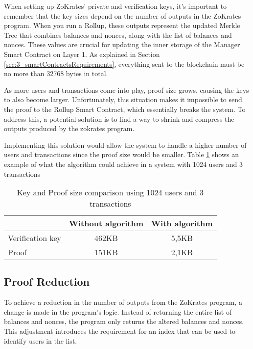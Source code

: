 When setting up ZoKrates' private and verification keys, it's important to remember that the key sizes depend on the number of outputs in the ZoKrates program. When you run a Rollup, these outputs represent the updated Merkle Tree that combines balances and nonces, along with the list of balances and nonces. These values are crucial for updating the inner storage of the Manager Smart Contract on Layer 1. As explained in Section \ref{sec:3_smartContractsRequirements}, everything sent to the blockchain must be no more than 32768 bytes in total.

As more users and transactions come into play, proof size grows, causing the keys to also become larger. Unfortunately, this situation makes it impossible to send the proof to the Rollup Smart Contract, which essentially breaks the system. To address this, a potential solution is to find a way to shrink and compress the outputs produced by the zokrates program.

Implementing this solution would allow the system to handle a higher number of users and transactions since the proof size would be smaller. Table \ref{tab:5_keyandproofsize} shows an example of what the algorithm could achieve in a system with 1024 users and 3 transactions

\begin{table}
	\centering
	\begin{tabular}{|l|c|c|}
		\hline
		                 & Without algorithm & With algorithm \\
		\hline
		Verification key & 462KB             & 5,5KB          \\
		\hline
		Proof            & 151KB             & 2,1KB          \\
		\hline
	\end{tabular}
	\caption[Key and Proof size]{Key and Proof size comparison using 1024 users and 3 transactions}
	\label{tab:5_keyandproofsize}
\end{table}

\subsection{Proof Reduction}

To achieve a reduction in the number of outputs from the ZoKrates program, a change is made in the program's logic. Instead of returning the entire list of balances and nonces, the program only returns the altered balances and nonces. This adjustment introduces the requirement for an index that can be used to identify users in the list.

